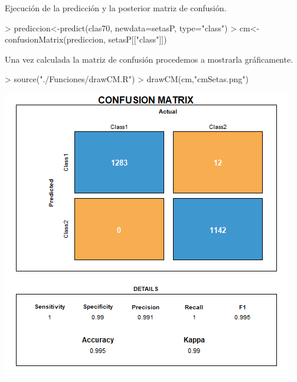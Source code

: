 \documentclass [a4paper] {article}
\begin{document}
\bigskip
Ejecución de la predicción y la posterior matriz de confusión.
\begin{Schunk}
\begin{Sinput}
> prediccion<-predict(clas70, newdata=setasP, type="class")
> cm<-confusionMatrix(prediccion, setasP[["class"]])
\end{Sinput}
\end{Schunk}

\bigskip
Una vez calculada la matriz de confusión procedemos a mostrarla gráficamente.
\begin{Schunk}
\begin{Sinput}
> source("./Funciones/drawCM.R")
> drawCM(cm,"cmSetas.png")
\end{Sinput}
\end{Schunk}
\includegraphics[width=\textwidth]{cmSetas}
\end{document}
